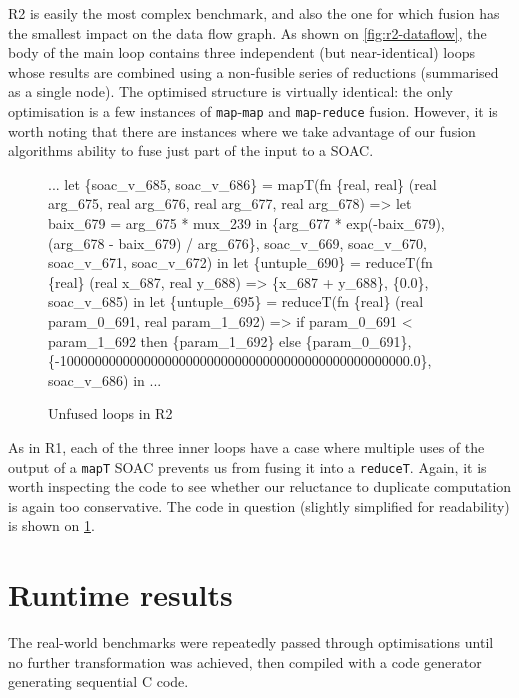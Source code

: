 R2 is easily the most complex benchmark, and also the one for which
fusion has the smallest impact on the data flow graph.  As shown on
\cref{fig:r2-dataflow}, the body of the main loop contains three
independent (but near-identical) loops whose results are combined
using a non-fusible series of reductions (summarised as a single
node).  The optimised structure is virtually identical: the only
optimisation is a few instances of \texttt{map}-\texttt{map} and
\texttt{map}-\texttt{reduce} fusion.  However, it is worth noting that
there are instances where we take advantage of our fusion algorithms
ability to fuse just part of the input to a SOAC.

\begin{figure}
\begin{center}
\begin{bcolorcode}
...
let \{soac_v_685, soac_v_686\} =
  mapT(fn \{real, real\} (real arg_675, real arg_676, real arg_677, real arg_678) =>
         let baix_679 = arg_675 * mux_239 in
         \{arg_677 * exp(-baix_679), (arg_678 - baix_679) / arg_676\},
       soac_v_669, soac_v_670, soac_v_671, soac_v_672) in
let \{untuple_690\} =
  reduceT(fn \{real\} (real x_687, real y_688) =>
            \{x_687 + y_688\},
          \{0.0\}, soac_v_685) in
let \{untuple_695\} =
  reduceT(fn \{real\} (real param_0_691, real param_1_692) =>
            if param_0_691 < param_1_692
            then \{param_1_692\}
            else \{param_0_691\},
          \{-10000000000000000000000000000000000000000000000000.0\},
          soac_v_686) in
...
\end{bcolorcode}
\end{center}
\caption{Unfused loops in R2}
\label{fig:r2-unfused-loops}
\end{figure}

As in R1, each of the three inner loops have a case where multiple
uses of the output of a \texttt{mapT} SOAC prevents us from fusing it
into a \texttt{reduceT}.  Again, it is worth inspecting the code to
see whether our reluctance to duplicate computation is again too
conservative.  The code in question (slightly simplified for
readability) is shown on \cref{fig:r2-unfused-loops}.



\section{Runtime results}
\label{sec:runtime-results}

The real-world benchmarks were repeatedly passed through \LO{}
optimisations until no further transformation was achieved, then
compiled with a code generator generating sequential C code.


